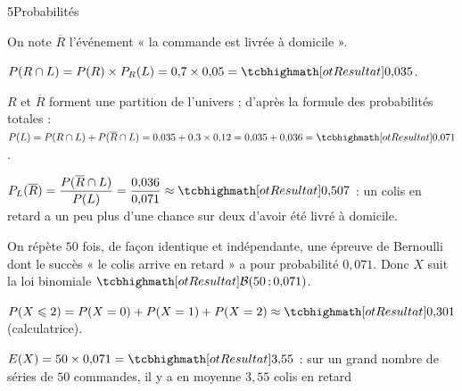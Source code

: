 

\begin{corrigeBac}{5}{Probabilités}
\begin{questions}
  \item On note $\overline R$ l'événement « la commande est livrée à domicile ».
\begin{center}
\end{center}
  \item $P(R\cap L)=P(R)\times P_R(L)=0{,}7\times0{,}05=\res{0{,}035}$. 
  \item $R$ et $\overline R$ forment une partition de l'univers ; d'après la formule des probabilités totales :
    $P(L)=P(R\cap L)+P(\overline R\cap L)=0{,}035+0{,}3\times0{,}12=0{,}035+0{,}036=\res{0{,}071}$. 
  \item $P_L(\overline R)=\dfrac{P(\overline R\cap L)}{P(L)}=\dfrac{0{,}036}{0{,}071}\approx\res{0{,}507}$ : un colis en retard a un peu plus
    d'une chance sur deux d'avoir été livré à domicile. 
\end{questions}
\begin{questions}[resume]
  \item On répète $50$ fois, de façon identique et indépendante, une épreuve de Bernoulli dont le succès « le colis arrive en retard »
    a pour probabilité $0{,}071$. Donc $X$ suit la loi binomiale $\res{\mathcal{B}(50\pv0{,}071)}$. 
  \item $P(X\leq2)=P(X=0)+P(X=1)+P(X=2)\approx\res{0{,}301}$ (calculatrice). 
  \item $E(X)=50\times0{,}071=\res{3{,}55}$ : sur un grand nombre de séries de $50$ commandes, il y a en moyenne $3{,}55$ colis en retard

\end{questions}
\end{corrigeBac}
